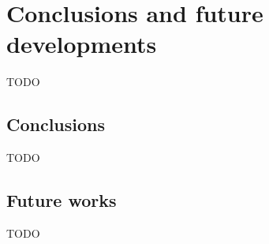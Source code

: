 \chapter{Conclusions and future developments}
\label{ch:conclusions}
TODO


\section{Conclusions}
TODO


\section{Future works}
TODO


\iffalse
In this chapter, you present the conclusions of your thesis and a couple of possible future works to extend your results. First of all, you should briefly repeat the problem you addressed in the thesis. Then, you report your achievements and how they improve the state of the art.

\section{Conclusions}
In this thesis, we analyzed the problem of ... . We proposed a new approach that ... . We tested this method on ... . Reported results show that our proposal outperforms the state of the art method.

\section{Future works}
There are several appealing paths for future works. A possible extension could be to ... .
\fi
